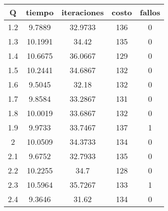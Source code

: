 \begin{table}[h!]
\centering
\begin{tabular}{ccccc}
Q & tiempo & iteraciones & costo & fallos \\ 
\hline 
1.2 & 9.7889 & 32.9733 & 136 & 0 \\ 
1.3 & 10.1991 & 34.42 & 135 & 0 \\ 
1.4 & 10.6675 & 36.0667 & 129 & 0 \\ 
1.5 & 10.2441 & 34.6867 & 132 & 0 \\ 
1.6 & 9.5045 & 32.18 & 132 & 0 \\ 
1.7 & 9.8584 & 33.2867 & 131 & 0 \\ 
1.8 & 10.0019 & 33.6867 & 132 & 0 \\ 
1.9 & 9.9733 & 33.7467 & 137 & 1 \\ 
2 & 10.0509 & 34.3733 & 134 & 0 \\ 
2.1 & 9.6752 & 32.7933 & 135 & 0 \\ 
2.2 & 10.2255 & 34.7 & 128 & 0 \\ 
2.3 & 10.5964 & 35.7267 & 133 & 1 \\ 
2.4 & 9.3646 & 31.62 & 134 & 0 \\ 
\hline 
\end{tabular}
\end{table}